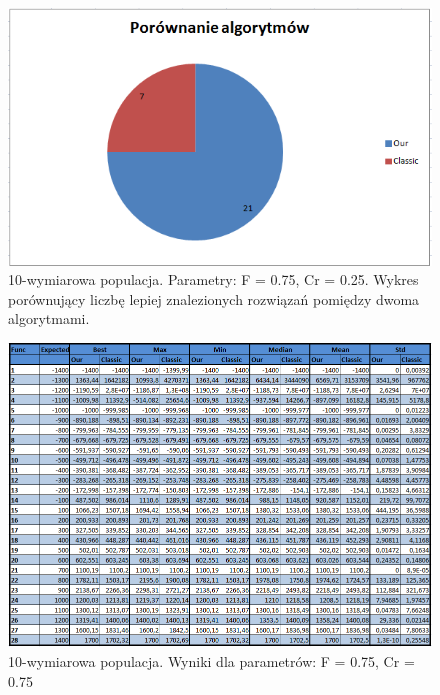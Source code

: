 \documentclass[a4paper]{article}
\begin{document}
\begin{figure}[!h]
\centering
\includegraphics[width=\textwidth]{F75Cr25L10statystyka.png}
\caption{10-wymiarowa populacja. Parametry: F = 0.75, Cr = 0.25. Wykres porównujący liczbę lepiej znalezionych rozwiązań pomiędzy dwoma algorytmami.}
\end{figure}

\begin{figure}[!h]
\centering
\includegraphics[width=\textwidth]{F75Cr75L10tab.png}
\caption{10-wymiarowa populacja. Wyniki dla parametrów: F = 0.75, Cr = 0.75}
\end{figure}
\end{document}
